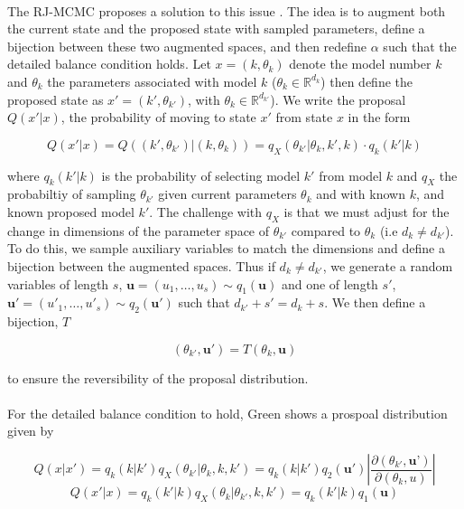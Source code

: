 \paragraph{}The RJ-MCMC proposes a solution to this issue \cite{Green1995-kh}. The idea is to augment both the current state and the proposed state with sampled parameters, define a bijection between these two augmented spaces, and then redefine $\alpha$ such that the detailed balance condition holds.  Let $x = (k, \theta_k)$ denote the model number $k$ and $\theta_k$ the parameters associated with model $k$ ($\theta_k \in \mathbb{R}^{d_k}$) then define the proposed state as $x' = (k', \theta_{k'})$, with $\theta_k \in \mathbb{R}^{d_{k'}}$). We write the proposal $Q(x' | x)$, the probability of moving to state $x'$ from state $x$ in the form

\begin{equation}
 Q(x'| x) = Q\left((k', \theta_{k'}) | (k, \theta_k) \right) = q_X(  \theta_{k'} |  \theta_k, k', k) \cdot q_k(k' | k)
\end{equation}

where $q_k(k' | k)$ is  the probability of selecting model $k'$ from model $k$ and $q_X$ the probabiltiy of sampling $\theta_{k'}$ given current parameters $\theta_k$ and with known  $k$, and known proposed model $k'$. The challenge with $q_X$ is that we must adjust for the change in dimensions of the parameter space of $\theta_{k'}$ compared to $\theta_k$ (i.e $d_k \neq d_{k'}$). To do this, we sample auxiliary variables to match the dimensions and define a bijection between the augmented spaces. Thus if $d_k \neq d_{k'}$, we generate a random variables of length $s$, $\mathbf{u} = (u_1, \dots, u_s) \sim q_1(\mathbf{u})$ and one of length $s'$, $\mathbf{u'} = (u'_1, \dots, u'_s) \sim q_2(\mathbf{u}')$ such that $d_{k'} + s'= d_k + s$. We then define a bijection, $T$

\begin{equation}
\label{eq:T}
(\theta_{k'}, \mathbf{u'}) = T(\theta_k, \mathbf{u}) 
\end{equation}

to ensure the reversibility of the proposal distribution. 

\paragraph{}For the detailed balance condition to hold, Green\cite{Green1995-kh} shows a prospoal distribution given by

$$Q(x | x') = q_k(k|k') q_X(\theta_{k'} | \theta_k, k, k') = q_k(k|k')q_2(\textbf{u}')\left|\frac{\partial(\theta_{k'}, \textbf{u'})}{\partial(\theta_k, u)} \right|$$ 
$$Q(x' | x) = q_k(k'|k) q_X(\theta_k | \theta_{k'}, k, k') = q_k(k'|k)q_1(\textbf{u})$$ 

